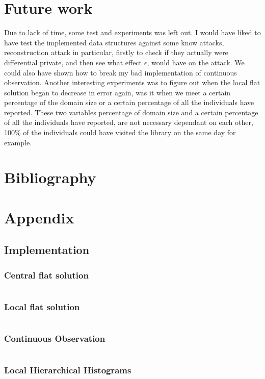 \documentclass[11pt]{article}
\theoremstyle{definition}
\begin{document}
\section{Future work}
Due to lack of time, some test and experiments was left out. I would have liked to have test the implemented data structures against some know attacks, reconstruction attack in particular, firstly to check if they actually were differential private, and then see what effect $\epsilon$, would have on the attack. We could also have shown how to break my bad implementation of continuous observation. Another interesting experiments was to figure out when the local flat solution began to decrease in error again, was it when we meet a certain percentage of the domain size or a certain percentage of all the individuals have reported. These two variables percentage of domain size and a certain percentage of all the individuals have reported, are not necessary dependant on each other, 100\% of the individuals could have visited the library on the same day for example. 


\newpage \section{Bibliography}
\printbibliography[]
\newpage \section{Appendix}
\subsection{Implementation}\label{app:imp}
\subsubsection{Central flat solution}
\inputminted[fontsize=\footnotesize,linenos]{python}{py_files/cen_flat.py}
\subsubsection{Local flat solution}
\inputminted[fontsize=\footnotesize,linenos]{python}{py_files/flat_olh.py}
\subsubsection{Continuous Observation}
\inputminted[fontsize=\footnotesize,linenos]{python}{py_files/con_obs.py}
\subsubsection{Local Hierarchical Histograms}
\inputminted[fontsize=\footnotesize,linenos]{python}{py_files/local_hh_object.py}
\end{document}
